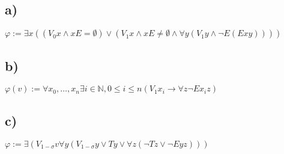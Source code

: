 \documentclass[11pt, a4paper]{article}
\renewcommand{\v}{\vee}
\newcommand{\n}{\wedge}
\begin{document}
\subsection*{a)}

$\varphi := \exists x ((V_0 x \n  xE = \emptyset) \v (V_1 x \n xE \neq \emptyset \n \forall y( V_1y \n \neg E(Exy))))$

\subsection*{b)}
$\varphi(v) := \forall x_0, \ldots, x_n \exists i \in \mathbb{N}, 0 \leq i \leq n (V_1 x_i \rightarrow \forall z \neg Ex_iz)$

\subsection*{c)}
$\varphi := \exists (V_{1-\sigma} v \forall y (V_{1-\sigma} y \v T y \v \forall z (\neg T z \v \neg Eyz)))$
\end{document}
